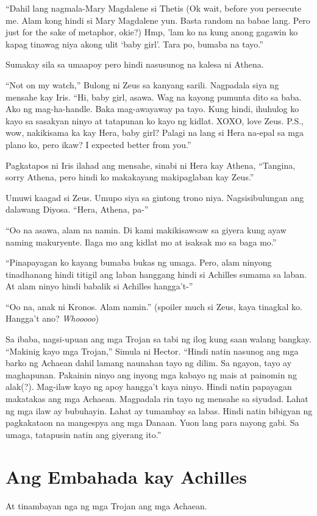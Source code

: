 \documentclass[12pt,letterpaper]{report}
\begin{document}
``Dahil lang nagmala-Mary Magdalene si Thetis (Ok wait, before you persecute me. Alam kong hindi si Mary Magdalene yun. Basta random na babae lang. Pero just for the sake of metaphor, okie?) Hmp, 'lam ko na kung anong gagawin ko kapag tinawag niya akong ulit `baby girl'. Tara po, bumaba na tayo.''

Sumakay sila sa umaapoy pero hindi nasusunog na kalesa ni Athena.

``Not on my watch,'' Bulong ni Zeus sa kanyang sarili. Nagpadala siya ng mensahe kay Iris. ``Hi, baby girl, asawa. Wag na kayong pumunta dito sa baba. Ako ng mag-ha-handle. Baka mag-awayaway pa tayo. Kung hindi, ihuhulog ko kayo sa sasakyan ninyo at tatapunan ko kayo ng kidlat. XOXO, love Zeus. P.S., wow, nakikisama ka kay Hera, baby girl? Palagi na lang si Hera na-epal sa mga plano ko, pero ikaw? I expected better from you.''

Pagkatapos ni Iris ilahad ang mensahe, sinabi ni Hera kay Athena, ``Tangina, sorry Athena, pero hindi ko makakayang makipaglaban kay Zeus.''

Umuwi kaagad si Zeus. Umupo siya sa gintong trono niya. Nagsisibulungan ang dalawang Diyosa. ``Hera, Athena, pa-''

``Oo na asawa, alam na namin. Di kami makikisawsaw sa giyera kung ayaw naming makuryente. Ilaga mo ang kidlat mo at isaksak mo sa baga mo.''

``Pinapayagan ko kayang bumaba bukas ng umaga. Pero, alam ninyong tinadhanang hindi titigil ang laban hanggang hindi si Achilles sumama sa laban. At alam ninyo hindi babalik si Achilles hangga't-''


``Oo na, anak ni Kronos. Alam namin.'' (spoiler much si Zeus, kaya tinagkal ko. Hangga't ano? \textit{Whooooo})

Sa ibaba, nagsi-upuan ang mga Trojan sa tabi ng ilog kung saan walang bangkay. ``Makinig kayo mga Trojan,'' Simula ni Hector. ``Hindi natin nasunog ang mga barko ng Achaean dahil lamang naunahan tayo ng dilim. Sa ngayon, tayo ay maghapunan. Pakainin ninyo ang inyong mga kabayo ng mais at painomin ng alak(?). Mag-ilaw kayo ng apoy hangga't kaya ninyo. Hindi natin papayagan makatakas ang mga Achaean. Magpadala rin tayo ng mensahe sa siyudad. Lahat ng mga ilaw ay bubuhayin. Lahat ay tumambay sa labas. Hindi natin bibigyan ng pagkakataon na mangespya ang mga Danaan. Yuon lang para nayong gabi. Sa umaga, tatapusin natin ang giyerang ito.''

\pagebreak
\chapter{Ang Embahada kay Achilles} %
At tinambayan nga ng mga Trojan ang mga Achaean.
\end{document}
